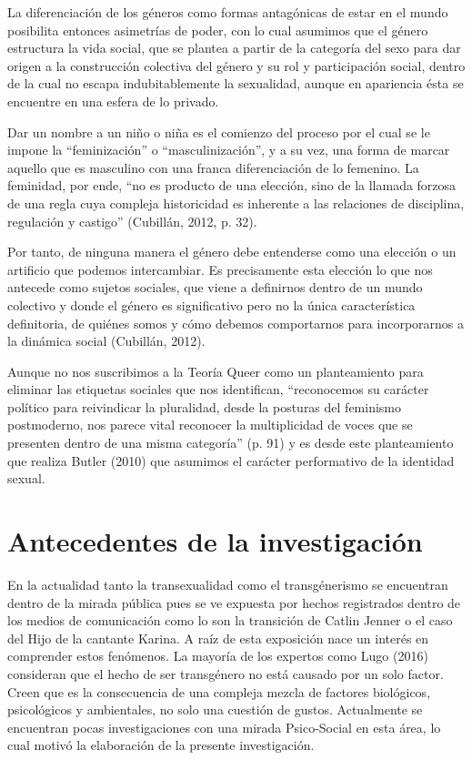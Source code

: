 La diferenciación de los géneros como formas antagónicas de estar en el mundo
posibilita entonces asimetrías de poder, con lo cual asumimos que el género
estructura la vida social, que se plantea a partir de la categoría del sexo para
dar origen a la construcción colectiva del género y su rol y participación
social, dentro de la cual no escapa indubitablemente la sexualidad, aunque en
apariencia ésta se encuentre en una esfera de lo privado.

Dar un nombre a un niño o niña es el comienzo del proceso por el cual se le
impone la “feminización” o “masculinización”, y a su vez, una forma de marcar
aquello que es masculino con una franca diferenciación de lo femenino.
La feminidad, por ende, “no es producto de una elección, sino de la llamada
forzosa de una regla cuya compleja historicidad es inherente a las relaciones de
disciplina, regulación y castigo” (Cubillán, 2012, p. 32).

Por tanto, de ninguna manera el género debe entenderse como una elección o un
artificio que podemos intercambiar.
Es precisamente esta elección lo que nos antecede como sujetos sociales, que
viene a definirnos dentro de un mundo colectivo y donde el género es
significativo pero no la única característica definitoria, de quiénes somos y
cómo debemos comportarnos para incorporarnos a la dinámica social (Cubillán,
2012).

Aunque no nos suscribimos a la Teoría Queer como un planteamiento para eliminar
las etiquetas sociales que nos identifican, “reconocemos su carácter político
para reivindicar la pluralidad, desde la posturas del feminismo postmoderno, nos
parece vital reconocer la multiplicidad de voces que se presenten dentro de
una misma categoría” (p. 91) y es desde este planteamiento que realiza Butler
(2010) que asumimos el carácter performativo de la identidad sexual.

\section{Antecedentes de la investigación}
En la actualidad tanto la transexualidad como el transgénerismo se encuentran
dentro de la mirada pública pues se ve expuesta por hechos registrados dentro de
los medios de comunicación como lo son la transición de Catlin Jenner o el caso
del Hijo de la cantante Karina.
A raíz de esta exposición nace un interés en comprender estos fenómenos.
La mayoría de los expertos como Lugo (2016) consideran que el hecho de ser
transgénero no está causado por un solo factor.
Creen que es la consecuencia de una compleja mezcla de factores biológicos,
psicológicos y ambientales, no solo una cuestión de gustos.
Actualmente se encuentran pocas investigaciones con una mirada Psico-Social en
esta área, lo cual motivó la elaboración de la presente investigación.

